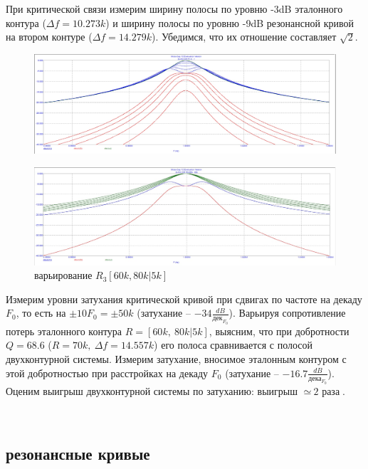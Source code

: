 \documentclass[a4paper, 14pt]{extarticle}%
\begin{document}
При критической связи измерим ширину полосы по уровню -3dB эталонного контура ($\Delta f = 10.273k$) и ширину полосы по уровню -9dB резонансной кривой на втором контуре ($\Delta f = 14.279k$). Убедимся, что их отношение составляет $\sqrt{2}$.


\begin{figure}[h!]
	\centering
			\includegraphics[width=1.1\linewidth]{1.5.jpg}
	\label{A}
\end{figure}

\begin{figure}[h!]
	\centering
			\includegraphics[width=1.1\linewidth]{1.5varR1.jpg}
            \caption{варьирование $R_3 [60k, 80k|5k]$}
	\label{A}
\end{figure}


Измерим уровни затухания критической кривой при сдвигах по частоте на декаду $F_0$, то есть на $\pm 10F_0 = \pm 50k$ (затухание -- $-34\frac{dB}{\text{дек}_{F_0}}$). Варьируя сопротивление потерь эталонного контура $R = [60k,~80k|5k]$, выясним, что при добротности $Q = 68.6$ ($R = 70k,~\Delta f = 14.557k$) его полоса сравнивается с полосой двухконтурной системы. Измерим затухание, вносимое эталонным контуром с этой добротностью при расстройках на декаду $F_0$ (затухание -- $-16.7\frac{dB}{\text{дека}_{F_0}}$). Оценим выигрыш двухконтурной системы по затуханию: выигрыш $\simeq~\text{2 раза}$.

~

\subsection{резонансные кривые}
\end{document}
